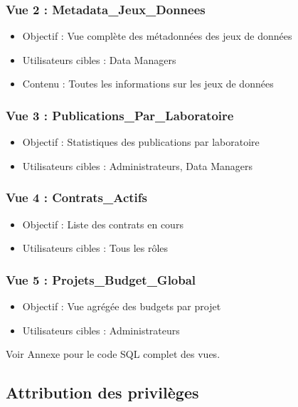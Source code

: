 \documentclass[12pt,a4paper]{article}
\begin{document}
\subsubsection{Vue 2 : Metadata\_Jeux\_Donnees}
\begin{itemize}
    \item Objectif : Vue complète des métadonnées des jeux de données
    \item Utilisateurs cibles : Data Managers
    \item Contenu : Toutes les informations sur les jeux de données
\end{itemize}

\subsubsection{Vue 3 : Publications\_Par\_Laboratoire}
\begin{itemize}
    \item Objectif : Statistiques des publications par laboratoire
    \item Utilisateurs cibles : Administrateurs, Data Managers
\end{itemize}

\subsubsection{Vue 4 : Contrats\_Actifs}
\begin{itemize}
    \item Objectif : Liste des contrats en cours
    \item Utilisateurs cibles : Tous les rôles
\end{itemize}

\subsubsection{Vue 5 : Projets\_Budget\_Global}
\begin{itemize}
    \item Objectif : Vue agrégée des budgets par projet
    \item Utilisateurs cibles : Administrateurs
\end{itemize}

Voir Annexe pour le code SQL complet des vues.

\subsection{Attribution des privilèges}
\end{document}
